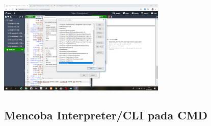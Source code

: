\documentclass{article}
\begin{document}
\begin{enumerate}
        \paragraph{}
            \centerline{\includegraphics[width=8cm]{image/pathnewok.png}}
\end{enumerate}
\subsection{Mencoba Interpreter/CLI pada CMD}
\end{document}
